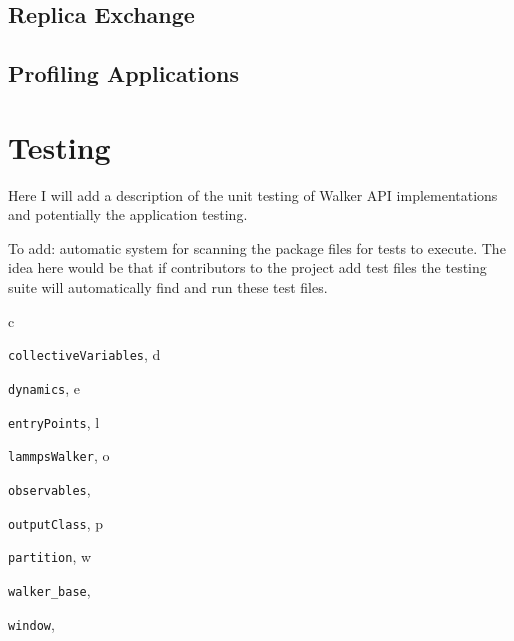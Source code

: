 \documentclass[letterpaper,10pt,english]{sphinxmanual}
\begin{document}
\section{Replica Exchange}
\label{applications/applications.doc:replica-exchange}

\section{Profiling Applications}
\label{applications/applications.doc:profiling-applications}

\chapter{Testing}
\label{test/testing.doc:testing}\label{test/testing.doc::doc}
Here I will add a description of the unit testing of Walker API implementations and potentially the application testing.

To add: automatic system for scanning the package files for tests to execute. The idea here would be that if contributors to the project add test files the testing suite will automatically find and run these test files.


\renewcommand{\indexname}{Python Module Index}
\begin{theindex}
\def\bigletter#1{{\Large\sffamily#1}\nopagebreak\vspace{1mm}}
\bigletter{c}
\item {\texttt{collectiveVariables}}, \pageref{walker_api/walker_api.doc:module-collectiveVariables}
\indexspace
\bigletter{d}
\item {\texttt{dynamics}}, \pageref{walker_api/walker_api.doc:module-dynamics}
\indexspace
\bigletter{e}
\item {\texttt{entryPoints}}, \pageref{applications/applications.doc:module-entryPoints}
\indexspace
\bigletter{l}
\item {\texttt{lammpsWalker}}, \pageref{walker_api/walker_api.doc:module-lammpsWalker}
\indexspace
\bigletter{o}
\item {\texttt{observables}}, \pageref{applications/applications.doc:module-observables}
\item {\texttt{outputClass}}, \pageref{walker_api/walker_api.doc:module-outputClass}
\indexspace
\bigletter{p}
\item {\texttt{partition}}, \pageref{applications/applications.doc:module-partition}
\indexspace
\bigletter{w}
\item {\texttt{walker\_base}}, \pageref{walker_api/walker_api.doc:module-walker_base}
\item {\texttt{window}}, \pageref{applications/applications.doc:module-window}
\end{theindex}

\renewcommand{\indexname}{Index}
\printindex
\end{document}
